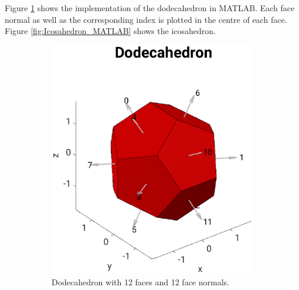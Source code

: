 \bigskip

Figure \ref{fig:Dodecahedron_MATLAB} shows the implementation of the dodecahedron in MATLAB. Each face normal as well as the corresponding index is plotted in the centre of each face. Figure \ref{fig:Icosahedron_MATLAB} shows the icosahedron.

\begin{figure}[H]
     \centering
     \begin{subfigure}[b]{0.47\textwidth}
         \centering
        \includegraphics[width=1.2\linewidth]{Graphics/Dodecahedron.eps}
         \caption{Dodecahedron with 12 faces and 12 face normals.}
         \label{fig:Dodecahedron_MATLAB}
     \end{subfigure}
     \hfill
     \begin{subfigure}[b]{0.47\textwidth}
         \centering

\end{subfigure}
\end{figure}
